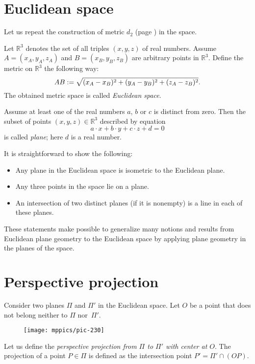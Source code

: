 \section*{Euclidean space}

Let us repeat the construction of metric $d_2$ (page 
\pageref{def:d_2}) in the space.

Let $\mathbb{R}^3$ denotes the set of all triples $(x,y,z)$ of real numbers.
Assume $A=(x_A,y_A,z_A)$ and $B=(x_B,y_B,z_B)$ are arbitrary points in $\mathbb{R}^3$.
Define the metric on $\mathbb{R}^3$ the following way:
$$AB
:=
\sqrt{(x_A-x_B)^2+(y_A-y_B)^2+(z_A-z_B)^2}.$$
The obtained metric space is called \emph{Euclidean space}.

Assume at least one of the real numbers $a$, $b$ or $c$ is distinct from zero.
Then the subset of points $(x,y,z)\in\mathbb{R}^3$ 
described by equation
$$a\cdot x+b\cdot y+c\cdot z+d=0$$ 
is called \emph{plane};
here $d$ is a real number.

It is straightforward to show the following:
\begin{itemize}
 \item Any plane in the Euclidean space is isometric to the Euclidean plane.
 \item Any three points in the space lie on a plane.
 \item An intersection of two distinct planes (if it is nonempty) is a line in each of these planes.
\end{itemize}

These statements make possible to generalize many notions and results from Euclidean plane geometry to the Euclidean space
by applying plane geometry in the planes of the space.

\section*{Perspective projection}

Consider two planes $\Pi$ and $\Pi'$ 
in the Euclidean space. 
Let $O$ be a point that does not belong neither to $\Pi$ nor~$\Pi'$.

\begin{wrapfigure}{o}{45mm}
\centering
\texttt{[image: mppics/pic-230]}
\end{wrapfigure}

Let us define the \emph{perspective projection from $\Pi$ to $\Pi'$ with center at $O$}.
The projection of a point $P\in \Pi$
is defined as the intersection point $P'=\Pi'\cap (OP)$.

